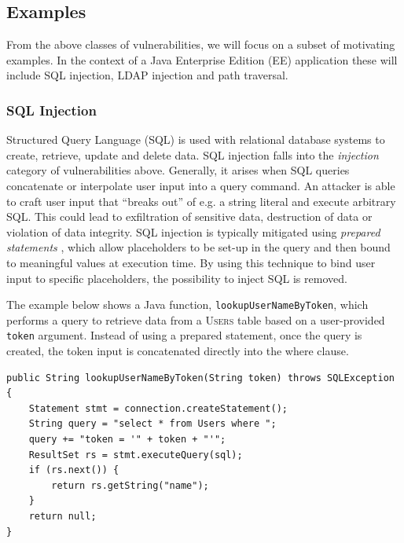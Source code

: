 \subsection{Examples}\label{subsec:examples}

From the above classes of vulnerabilities, we will focus on a subset of motivating examples.
In the context of a Java Enterprise Edition (EE) application these will include SQL injection, LDAP injection and
path traversal.

\subsubsection{SQL Injection}
\label{ex:sqli}

Structured Query Language (SQL) is used with relational database systems to create, retrieve, update and delete data.
SQL injection falls into the \emph{injection} category of vulnerabilities above.
Generally, it arises when SQL queries concatenate or interpolate user input into a query command.
An attacker is able to craft user input that ``breaks out'' of e.g. a string literal and execute arbitrary SQL.
This could lead to exfiltration of sensitive data, destruction of data or violation of data integrity.
SQL injection is typically mitigated using \emph{prepared statements} \citep{stuttard2011web}, which allow placeholders to be set-up in the
query and then bound to meaningful values at execution time.
By using this technique to bind user input to specific placeholders, the possibility to inject SQL is removed.

The example below shows a Java function, \texttt{lookupUserNameByToken}, which performs a query to retrieve data from
a \textsc{Users} table based on a user-provided \texttt{token} argument.
Instead of using a prepared statement, once the query is created, the token input is concatenated directly into the
\textcolor{id7-aubergine}{where} clause.

\newsavebox\myv

\begin{lrbox}{\myv}\begin{minipage}{\textwidth}
\begin{verbatim}
public String lookupUserNameByToken(String token) throws SQLException {
    Statement stmt = connection.createStatement();
    String query = "select * from Users where ";
    query += "token = '" + token + "'";
    ResultSet rs = stmt.executeQuery(sql);
    if (rs.next()) {
        return rs.getString("name");
    }
    return null;
}
\end{verbatim}
\end{minipage}\end{lrbox}

